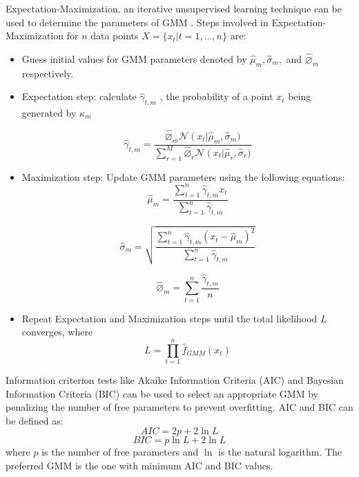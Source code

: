 Expectation-Maximization, an iterative unsupervised learning technique can be used to determine the parameters of GMM \cite{Dempster1977}. Steps involved in Expectation-Maximization for \( n\)  data points \( X = \{ x_{t}\vert t = 1,\ldots ,n\}\)  are:
\begin{itemize}
	\item Guess initial values for GMM parameters denoted by \(\hat{\mu }_{m},\hat{\sigma }_{m},\)  and \( \hat{\varnothing }_{m}\)  respectively.
	
	\item  Expectation step: calculate \(\hat{\gamma }_{t,m}\) , the probability of a point \( x_{t}\)  being generated by \( \kappa_{m}\)
	
	\begin{equation}
		\hat{\gamma }_{t,m} = \frac{\hat{\varnothing }_{m}\mathcal{N}\left(x_{t}\right\vert \hat{\mu }_{m},\hat{\sigma }_{m})}{\sum_{r = 1}^{M}\hat{\varnothing }_{r}\mathcal{N}\left(x_{t}\right\vert \hat{\mu }_{r},\hat{\sigma }_{r})}
	\end{equation}
	
	\item Maximization step: Update GMM parameters using the following equations:
	\begin{equation}
		\hat{\mu }_{m} =\frac{\sum_{t = 1}^{n}\hat{\gamma }_{t,m}x_{t}}{\sum_{t = 1}^{n}\hat{\gamma }_{t,m}}
	\end{equation}
	
	\begin{equation}
		\hat{\sigma }_{m} =\sqrt{\frac{\sum_{t = 1}^{n}\hat{\gamma }_{t,m}(x_{t}-\hat{\mu }_{m})^{2}}{\sum_{t = 1}^{n}\hat{\gamma }_{t,m}}}
	\end{equation}
	
	\begin{equation}
		\hat{\varnothing }_{m} = \sum_{t = 1}^{n}\frac{\hat{\gamma }_{t,m}}{n}
	\end{equation}
	
	\item Repeat Expectation and Maximization steps until the total likelihood $L$ converges, where
	\begin{equation}
		L = \prod_{t = 1}^{n}\hat{f}_{GMM}\left(x_{t}\right)
	\end{equation}
\end{itemize}

Information criterion tests like Akaike Information Criteria (AIC) \cite{Akaike1974} and Bayesian Information Criteria (BIC) \cite{Schwarz2007} can be used to select an appropriate GMM by penalizing the number of free parameters to prevent overfitting. AIC and BIC can be defined as:
\begin{equation}
	AIC = 2p+2\ln L
\end{equation}
\begin{equation}
	BIC = p\ln L+2\ln L
\end{equation}
where $p$ is the number of free parameters and $\ln$ is the natural logarithm. The preferred GMM is the one with minimum AIC and BIC values.

